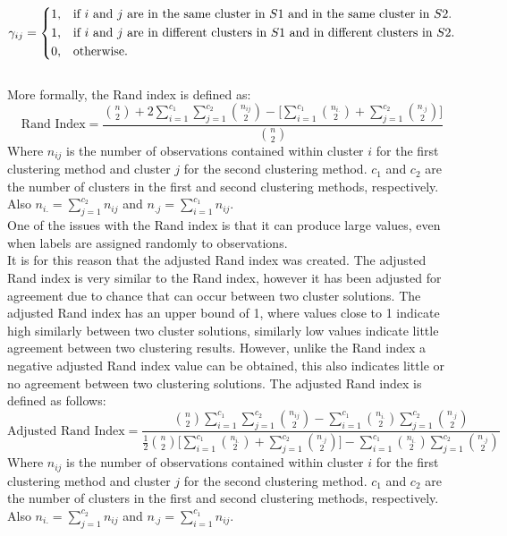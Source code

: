 \documentclass[]{article}
\begin{document}
\[ 
 	\gamma_{ij} = 
  	\begin{dcases*} 
  		1, & if $i$ and $j$ are in the same cluster in $S1$ and in the same cluster in $S2$.\\ 
		1, & if $i$ and $j$ are in different clusters in $S1$ and in different clusters in $S2$.\\ 
  		0, & otherwise. 
  	\end{dcases*} 
\]\\

\noindent More formally, the Rand index is defined as:
\begin{equation}
	\text{Rand Index} = \frac{{{n}\choose{2}} + 2\sum_{i = 1}^{c_1}\sum_{j = 1}^{c_2} {{n_{ij}}\choose{2}} - \Big[ \sum_{i = 1}^{c_1} {{n_{i.}}\choose{2}} + \sum_{j = 1}^{c_2} {{n_{.j}}\choose{2}} \Big]}{{{n}\choose{2}}}
\end{equation}
Where $n_{ij}$ is the number of observations contained within cluster $i$ for the first clustering method and cluster $j$ for the second clustering method. $c_1$ and $c_2$ are the number of clusters in the first and second clustering methods, respectively. Also $n_{i.} = \sum_{j = 1}^{c_2}n_{ij}$ and $n_{.j} = \sum_{i = 1}^{c_1}n_{ij}$.\\



\noindent One of the issues with the Rand index is that it can produce large values, even when labels are assigned randomly to observations. \\

\noindent It is for this reason that the adjusted Rand index was created. The adjusted Rand index is very similar to the Rand index, however it has been adjusted for agreement due to chance that can occur between two cluster solutions. The adjusted Rand index has an upper bound of 1, where values close to 1 indicate high similarly between two cluster solutions, similarly low values indicate little agreement between two clustering results. However, unlike the Rand index a negative adjusted Rand index value can be obtained, this also indicates little or no agreement between two clustering solutions. 
The adjusted Rand index is defined as follows:
\begin{equation}
\text{Adjusted Rand Index} = \frac{{{n}\choose{2}} \sum_{i = 1}^{c_1}\sum_{j = 1}^{c_2} {{n_{ij}}\choose{2}} - \sum_{i = 1}^{c_1} {{n_{i.}}\choose{2}} \sum_{j = 1}^{c_2} {{n_{.j}}\choose{2}}}{\frac{1}{2}{{n}\choose{2}}\Big[ \sum_{i = 1}^{c_1}{{n_{i.}}\choose{2}} + \sum_{j = 1}^{c_2}{{n_{.j}}\choose{2}}\Big] - \sum_{i = 1}^{c_1}{{n_{i.}}\choose{2}}\sum_{j = 1}^{c_2}{{n_{.j}}\choose{2}}}
\end{equation}
Where $n_{ij}$ is the number of observations contained within cluster $i$ for the first clustering method and cluster $j$ for the second clustering method. $c_1$ and $c_2$ are the number of clusters in the first and second clustering methods, respectively. Also $n_{i.} = \sum_{j = 1}^{c_2}n_{ij}$ and $n_{.j} = \sum_{i = 1}^{c_1}n_{ij}$.
\end{document}
